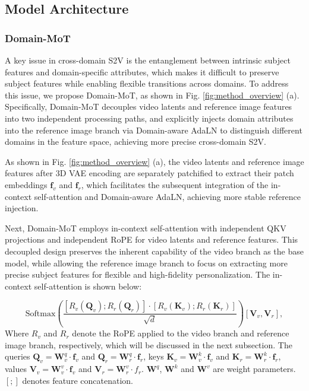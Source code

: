 \documentclass{llmxive}
\begin{document}
\subsection{Model Architecture} 
\subsubsection{Domain-MoT}


A key issue in cross-domain S2V is the entanglement between intrinsic subject features and domain-specific attributes, which makes it difficult to preserve subject features while enabling flexible transitions across domains. To address this issue, we propose Domain-MoT, as shown in Fig. \ref{fig:method_overview} (a). Specifically, Domain-MoT decouples video latents and reference image features into two independent processing paths, and explicitly injects domain attributes into the reference image branch via Domain-aware AdaLN to distinguish different domains in the feature space, achieving more precise cross-domain S2V.

As shown in Fig. \ref{fig:method_overview} (a), the video latents and reference image features after 3D VAE encoding are separately patchified to extract their patch embeddings $\boldsymbol{f}_v$ and $\boldsymbol{f}_r$, which facilitates the subsequent integration of the in-context self-attention and Domain-aware AdaLN, achieving more stable reference injection.

Next, Domain-MoT employs in-context self-attention with independent QKV projections and independent RoPE for video latents and reference features. This decoupled design preserves the inherent capability of the video branch as the base model, while allowing the reference image branch to focus on extracting more precise subject features for flexible and high-fidelity personalization. The in-context self-attention is shown below:


\begin{equation}
\label{eq:attention}
 \text{Softmax}\left( \frac{ [ R_{v}(  \boldsymbol{Q}_{v}); R_{r}(\boldsymbol{Q}_{r})] \cdot [ R_{v}(  \boldsymbol{K}_{v}); R_{r}(\boldsymbol{K}_{r})]}{\sqrt{d}} \right)  [\boldsymbol{V}_{v},\boldsymbol{V}_{r}], 
\end{equation}
Where $ R_{v}$ and $ R_{r}$ denote the RoPE applied to the video branch and reference image branch, respectively, which will be discussed in the next subsection. The queries $\boldsymbol{Q}_v=\boldsymbol{W}^q_v\cdot \boldsymbol{f}_v$ and $\boldsymbol{Q}_r=\boldsymbol{W}^q_r \cdot \boldsymbol{f}_r$,  keys  $\boldsymbol{K}_v=\boldsymbol{W}^k_v \cdot \boldsymbol{f}_v$ and $\boldsymbol{K}_r=\boldsymbol{W}^k_r \cdot \boldsymbol{f}_r$, values $\boldsymbol{V}_v=\boldsymbol{W}_v^v \cdot \boldsymbol{f}_v$ and $\boldsymbol{V}_r=\boldsymbol{W}^v_r \cdot f_r$. $\boldsymbol{W}^q$,  $\boldsymbol{W}^k$ and $\boldsymbol{W}^v$ are weight parameters. \( [; ] \) denotes feature concatenation. %
\end{document}
